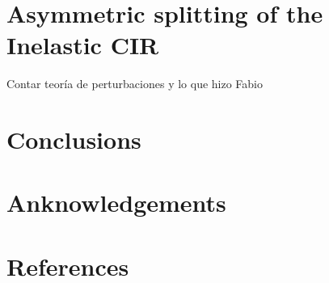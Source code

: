 \documentclass[aps,pre,twocolumn,superscriptaddress,showpacs]{revtex4-1}
\begin{document}
\section{Asymmetric splitting of the Inelastic CIR} \label{sec:perturbation}
Contar teoría de perturbaciones y lo que hizo Fabio

\section{Conclusions}
\section*{Anknowledgements}
\section*{References}



\newpage
\end{document}
